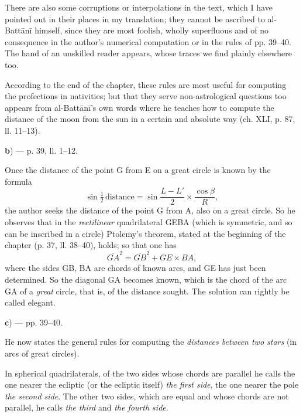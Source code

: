 \documentclass[11pt]{article}
\newcommand{\Pg}[1]{\marginpar{\footnotesize\color{gray}#1}}
\begin{document}
\par There are also some corruptions or interpolations in the text, which I have pointed out in their places in my translation; they cannot be ascribed to al-Battānī himself, since they are most foolish, wholly superfluous and of no consequence in the author's numerical computation or in the rules of pp. 39–40. The hand of an unskilled reader appears, whose traces we find plainly elsewhere too.\par
\par According to the end of the chapter, these rules are most useful for computing the profections in nativities; but that they serve non-astrological questions too appears from al-Battānī's own words where he teaches how to compute the distance of the moon from the sun in a certain and absolute way (ch. XLI, p. 87, ll. 11–13).\par
\par\begin{center}\textbf{b}) — p. 39, ll. 1–12.\end{center}
\par \Pg{I 202}Once the distance of the point G from E on a great circle is known by the formula \[ \sin\tfrac{1}{2}\,\text{distance} = \sin\frac{L - L'}{2} \times \frac{\cos\beta}{R}, \] the author seeks the distance of the point G from A, also on a great circle. So he observes that in the \emph{rectilinear} quadrilateral GEBA (which is symmetric, and so can be inscribed in a circle) Ptolemy's theorem, stated at the beginning of the chapter (p. 37, ll. 38–40), holds; so that one has \[ \overline{GA}^2 = \overline{GB}^2 + GE \times BA, \] where the sides GB, BA are chords of known arcs, and GE has just been determined. So the diagonal GA becomes known, which is the chord of the arc GA of a \emph{great} circle, that is, of the distance sought. The solution can rightly be called elegant.\par
\par\begin{center}\textbf{c}) — pp. 39–40.\end{center}
\par He now states the general rules for computing the \emph{distances between two stars} (in arcs of great circles).\par
\par In spherical quadrilaterals, of the two sides whose chords are parallel he calls the one nearer the ecliptic (or the ecliptic itself) \emph{the first side}, the one nearer the pole \emph{the second side}. The other two sides, which are equal and whose chords are not parallel, he calls \emph{the third} and \emph{the fourth side}.\par
\end{document}
